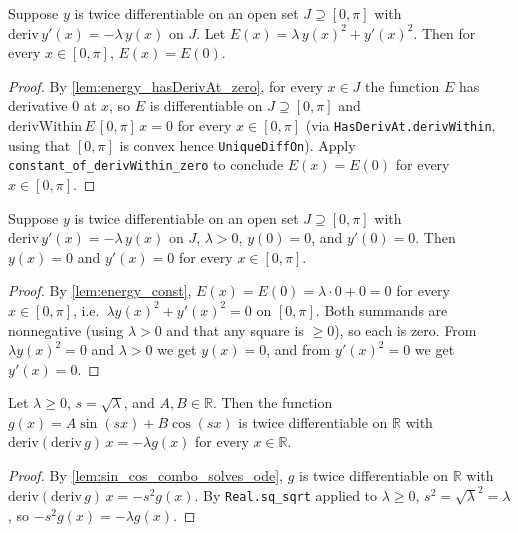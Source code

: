 \begin{lemma}
    \label{lem:energy_const}
    \leanok
    Suppose $y$ is twice differentiable on an open set $J \supseteq [0,\pi]$
    with $\mathrm{deriv}\, y'(x) = -\lambda \, y(x)$ on $J$. Let
    $E(x) = \lambda \, y(x)^2 + y'(x)^2$. Then for every $x \in [0,\pi]$,
    $E(x) = E(0)$.
\end{lemma}
\begin{proof}
    By \cref{lem:energy_hasDerivAt_zero}, for every $x \in J$ the function $E$
    has derivative $0$ at $x$, so $E$ is differentiable on $J \supseteq [0,\pi]$
    and $\mathrm{derivWithin}\, E\, [0,\pi]\, x = 0$ for every $x \in [0,\pi]$
    (via \texttt{HasDerivAt.derivWithin}, using that $[0,\pi]$ is convex hence
    \texttt{UniqueDiffOn}). Apply \texttt{constant\_of\_derivWithin\_zero} to
    conclude $E(x) = E(0)$ for every $x \in [0,\pi]$.
\end{proof}

\begin{lemma}
    \label{lem:zero_initial_zero_solution}
    \leanok
    Suppose $y$ is twice differentiable on an open set $J \supseteq [0,\pi]$
    with $\mathrm{deriv}\, y'(x) = -\lambda \, y(x)$ on $J$, $\lambda > 0$,
    $y(0) = 0$, and $y'(0) = 0$. Then $y(x) = 0$ and $y'(x) = 0$ for every
    $x \in [0,\pi]$.
\end{lemma}
\begin{proof}
    By \cref{lem:energy_const}, $E(x) = E(0) = \lambda \cdot 0 + 0 = 0$ for every
    $x \in [0,\pi]$, i.e.\ $\lambda y(x)^2 + y'(x)^2 = 0$ on $[0,\pi]$. Both
    summands are nonnegative (using $\lambda > 0$ and that any square is
    $\ge 0$), so each is zero. From $\lambda y(x)^2 = 0$ and $\lambda > 0$ we get
    $y(x) = 0$, and from $y'(x)^2 = 0$ we get $y'(x) = 0$.
\end{proof}

\begin{lemma}[$A\sin(sx) + B\cos(sx)$ solves $-y'' = \lambda y$ when $s = \sqrt{\lambda}$]
    \label{lem:sin_cos_combo_solves_ode_lambda}
    Let $\lambda \ge 0$, $s = \sqrt{\lambda}$, and $A, B \in \mathbb{R}$. Then
    the function $g(x) = A \sin(sx) + B \cos(sx)$ is twice differentiable on
    $\mathbb{R}$ with $\mathrm{deriv}(\mathrm{deriv}\, g)\, x = -\lambda g(x)$
    for every $x \in \mathbb{R}$.
\end{lemma}
\begin{proof}
    By \cref{lem:sin_cos_combo_solves_ode}, $g$ is twice differentiable on
    $\mathbb{R}$ with $\mathrm{deriv}(\mathrm{deriv}\, g)\, x = -s^2 g(x)$.
    By \texttt{Real.sq\_sqrt} applied to $\lambda \ge 0$, $s^2 = \sqrt{\lambda}^2
    = \lambda$, so $-s^2 g(x) = -\lambda g(x)$.
\end{proof}

